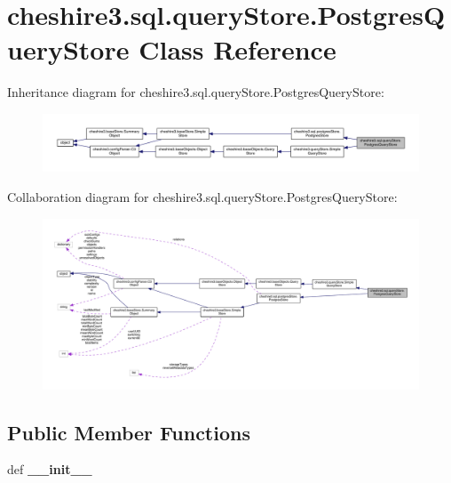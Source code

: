\hypertarget{classcheshire3_1_1sql_1_1query_store_1_1_postgres_query_store}{\section{cheshire3.\-sql.\-query\-Store.\-Postgres\-Query\-Store Class Reference}
\label{classcheshire3_1_1sql_1_1query_store_1_1_postgres_query_store}
}


Inheritance diagram for cheshire3.\-sql.\-query\-Store.\-Postgres\-Query\-Store\-:
\nopagebreak
\begin{figure}[H]
\begin{center}
\leavevmode
\includegraphics[width=350pt]{classcheshire3_1_1sql_1_1query_store_1_1_postgres_query_store__inherit__graph}
\end{center}
\end{figure}


Collaboration diagram for cheshire3.\-sql.\-query\-Store.\-Postgres\-Query\-Store\-:
\nopagebreak
\begin{figure}[H]
\begin{center}
\leavevmode
\includegraphics[width=350pt]{classcheshire3_1_1sql_1_1query_store_1_1_postgres_query_store__coll__graph}
\end{center}
\end{figure}
\subsection*{Public Member Functions}
\begin{DoxyCompactItemize}
\item 
\hypertarget{classcheshire3_1_1sql_1_1query_store_1_1_postgres_query_store_a58fd0285336103439631489693c2db21}{def {\bfseries \-\_\-\-\_\-init\-\_\-\-\_\-}}\label{classcheshire3_1_1sql_1_1query_store_1_1_postgres_query_store_a58fd0285336103439631489693c2db21}

\end{DoxyCompactItemize}
